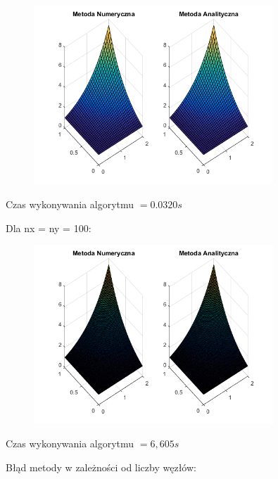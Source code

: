 \begin{figure}[!ht]
	\begin{center}
		\includegraphics[width=0.8\textwidth]{Lab5/charts/zad2/30x30.png}
	\end{center}
\end{figure}

Czas wykonywania algorytmu $ = 0.0320 s$

Dla nx = ny = 100:

\begin{figure}[!ht]
	\begin{center}
		\includegraphics[width=0.8\textwidth]{Lab5/charts/zad2/100x100.png}
	\end{center}
\end{figure}

Czas wykonywania algorytmu $ = 6,605 s$

\newpage

Błąd metody w zależności od liczby węzłów:

